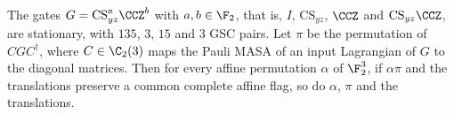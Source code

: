The gates $G=\mathrm{CS}_{yz}^a\CCZ^b$ with $a,b\in\F_2$, that is, $I$, $\mathrm{CS}_{yz}$, $\CCZ$ and $\mathrm{CS}_{yz}\CCZ$, are stationary, with $135$, $3$, $15$ and $3$ GSC pairs. Let $\pi$ be the permutation of $CGC^\dagger$, where $C\in\C_2(3)$ maps the Pauli MASA of an input Lagrangian of $G$ to the diagonal matrices. Then for every affine permutation $\alpha$ of $\F_2^3$, if $\alpha\pi$ and the translations preserve a common complete affine flag, so do $\alpha$, $\pi$ and the translations.
